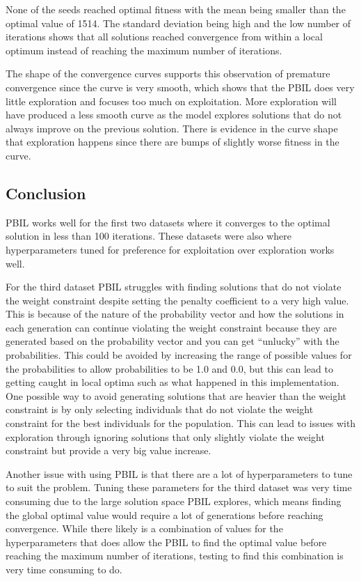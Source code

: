\documentclass{article}
\begin{document}
None of the seeds reached optimal fitness with the mean being smaller than the optimal value of 1514. The standard deviation being high and the low number of iterations shows that all solutions reached convergence from within a local optimum instead of reaching the maximum number of iterations. \par

\noindent The shape of the convergence curves supports this observation of premature convergence since the curve is very smooth, which shows that the PBIL does very little exploration and focuses too much on exploitation. More exploration will have produced a less smooth curve as the model explores solutions that do not always improve on the previous solution. There is evidence in the curve shape that exploration happens since there are bumps of slightly worse fitness in the curve. \par

\subsection*{Conclusion}
PBIL works well for the first two datasets where it converges to the optimal solution in less than 100 iterations. These datasets were also where hyperparameters tuned for preference for  exploitation over exploration works well. \par 

\noindent For the third dataset PBIL struggles with finding solutions that do not violate the weight constraint despite setting the penalty coefficient to a very high value. This is because of the nature of the probability vector and how the solutions in each generation can continue violating the weight constraint because they are generated based on the probability vector and you can get “unlucky” with the probabilities. This could be avoided by increasing the range of possible values for the probabilities to allow probabilities to be 1.0 and 0.0, but this can lead to getting caught in local optima such as what happened in this implementation. One possible way to avoid generating solutions that are heavier than the weight constraint is by only selecting individuals that do not violate the weight constraint for the best individuals for the population. This can lead to issues with exploration through ignoring solutions that only slightly violate the weight constraint but provide a very big value increase. \par

\noindent Another issue with using PBIL is that there are a lot of hyperparameters to tune to suit the problem. Tuning these parameters for the third dataset was very time consuming due to the large solution space PBIL explores, which means finding the global optimal value would require a lot of generations before reaching convergence. While there likely is a combination of values for the hyperparameters that does allow the PBIL to find the optimal value before reaching the maximum number of iterations, testing to find this combination is very time consuming to do. \par
\end{document}
